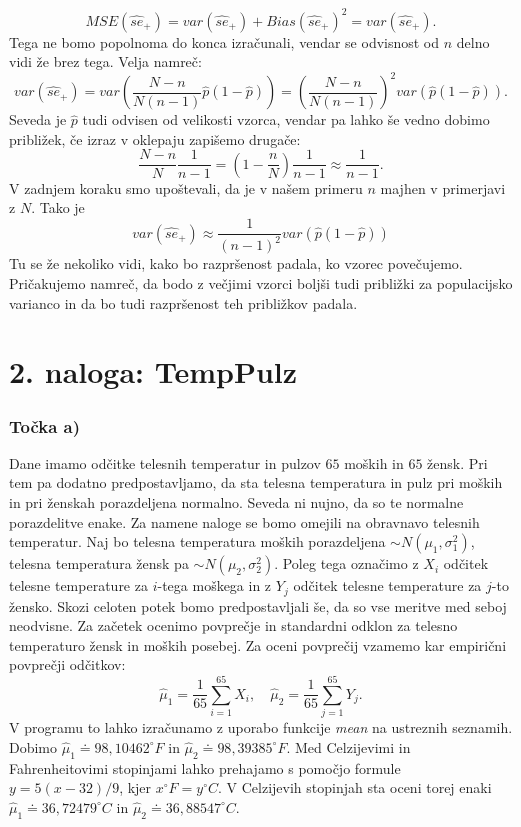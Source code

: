 \documentclass[12pt, letterpaper]{article}
\begin{document}
\[
MSE(\hat{se}_+) = var(\hat{se}_+) + Bias(\hat{se}_+)^2 = var(\hat{se}_+).
\]
Tega ne bomo popolnoma do konca izračunali, vendar se odvisnost od $n$ delno vidi že brez tega. Velja namreč:
\[
var(\hat{se}_+) = var\left(\frac{N-n}{N(n-1)}\hat{p}(1 - \hat{p})\right) = \left(\frac{N-n}{N(n-1)}\right)^2 var(\hat{p}(1 - \hat{p})).
\]
Seveda je $\hat{p}$ tudi odvisen od velikosti vzorca, vendar pa lahko še vedno dobimo približek, če izraz v oklepaju zapišemo drugače:
\[
\frac{N-n}{N}\frac{1}{n-1} = \left(1 - \frac{n}{N}\right)\frac{1}{n-1} \approx \frac{1}{n-1}.
\]
V zadnjem koraku smo upoštevali, da je v našem primeru $n$ majhen v primerjavi z $N$. Tako je
\[
var(\hat{se}_+) \approx \frac{1}{(n-1)^2}var(\hat{p}(1 - \hat{p}))
\]
Tu se že nekoliko vidi, kako bo razpršenost padala, ko vzorec povečujemo. Pričakujemo namreč, da bodo z večjimi vzorci boljši tudi približki za populacijsko varianco in da bo tudi razpršenost teh približkov padala.

\section*{2. naloga: TempPulz}

\subsubsection*{Točka a)} Dane imamo odčitke telesnih temperatur in pulzov $65$ moških in $65$ žensk. Pri tem pa dodatno predpostavljamo, da sta telesna temperatura in pulz pri moških in pri ženskah porazdeljena normalno. Seveda ni nujno, da so te normalne porazdelitve enake. Za namene naloge se bomo omejili na obravnavo telesnih temperatur. Naj bo telesna temperatura moških porazdeljena $\sim N(\mu_1, \sigma^2_1)$, telesna temperatura žensk pa $\sim N(\mu_2,\sigma^2_2)$. Poleg tega označimo z $X_i$ odčitek telesne temperature za $i$-tega moškega in z $Y_j$ odčitek telesne temperature za $j$-to žensko. Skozi celoten potek bomo predpostavljali še, da so vse meritve med seboj neodvisne. Za začetek ocenimo povprečje in standardni odklon za telesno temperaturo žensk in moških posebej. Za oceni povprečij vzamemo kar empirični povprečji odčitkov:
\[
\hat{\mu}_1 = \frac{1}{65}\sum_{i=1}^{65} X_i, \quad \hat{\mu}_2 = \frac{1}{65}\sum_{j=1}^{65} Y_j.
\]
V programu to lahko izračunamo z uporabo funkcije \emph{mean} na ustreznih seznamih. Dobimo $\hat{\mu}_1 \doteq 98,10462^{\circ}F$ in $\hat{\mu}_2 \doteq 98,39385^{\circ}F$. Med Celzijevimi in Fahrenheitovimi stopinjami lahko prehajamo s pomočjo formule $y = 5(x-32)/9$, kjer $x^{\circ}F = y^{\circ}C$. V Celzijevih stopinjah sta oceni torej enaki $\hat{\mu}_1 \doteq 36,72479^{\circ}C$ in $\hat{\mu}_2 \doteq 36,88547^{\circ}C$.
\end{document}
